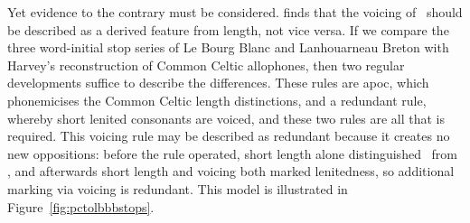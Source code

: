 Yet evidence to the contrary must be considered. \Textcite{carlyle_syllabic_1988} finds that the voicing of \lT\ should be described as a derived feature from length, not vice versa. If we compare the three word-initial stop series of Le Bourg Blanc and Lanhouarneau Breton with Harvey's reconstruction of Common Celtic allophones, then two regular developments suffice to describe the differences. These rules are \gls{apoc}, which phonemicises the Common Celtic length distinctions, and a redundant rule, whereby short \ie lenited consonants are voiced, and these two rules are all that is required. This voicing rule may be described as redundant because it creates no new oppositions: before the rule operated, short length alone distinguished \lT\ from \xT, and afterwards short length and voicing both marked lenitedness, so additional marking via voicing is redundant. This model is illustrated in Figure~\ref{fig:pctolbbbstops}.


